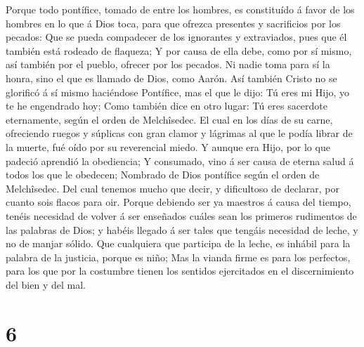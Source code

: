  Porque todo pontífice, tomado de entre los hombres, es
constituído á favor de los hombres en lo que á Dios toca, para que
ofrezca presentes y sacrificios por los pecados:  Que se
pueda compadecer de los ignorantes y extraviados, pues que él también
está rodeado de flaqueza;  Y por causa de ella debe, como
por sí mismo, así también por el pueblo, ofrecer por los pecados.
 Ni nadie toma para sí la honra, sino el que es llamado de
Dios, como Aarón.  Así también Cristo no se glorificó á sí
mismo haciéndose Pontífice, mas el que le dijo: Tú eres mi Hijo, yo te
he engendrado hoy;  Como también dice en otro lugar: Tú eres
sacerdote eternamente, según el orden de Melchîsedec.  El
cual en los días de su carne, ofreciendo ruegos y súplicas con gran
clamor y lágrimas al que le podía librar de la muerte, fué oído por su
reverencial miedo.  Y aunque era Hijo, por lo que padeció
aprendió la obediencia;  Y consumado, vino á ser causa de
eterna salud á todos los que le obedecen;  Nombrado de Dios
pontífice según el orden de Melchîsedec.  Del cual tenemos
mucho que decir, y dificultoso de declarar, por cuanto sois flacos para
oir.  Porque debiendo ser ya maestros á causa del tiempo,
tenéis necesidad de volver á ser enseñados cuáles sean los primeros
rudimentos de las palabras de Dios; y habéis llegado á ser tales que
tengáis necesidad de leche, y no de manjar sólido.  Que
cualquiera que participa de la leche, es inhábil para la palabra de la
justicia, porque es niño;  Mas la vianda firme es para los
perfectos, para los que por la costumbre tienen los sentidos ejercitados
en el discernimiento del bien y del mal.

\hypertarget{section-5}{%
\section{6}\label{section-5}}

